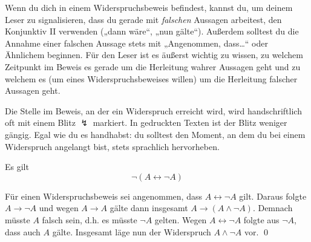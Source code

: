   
\begin{bem}[Signalwörter]
    Wenn du dich in einem Widerspruchsbeweis befindest, kannst du, um deinem Leser zu signalisieren, dass du gerade mit \emph{falschen} Aussagen arbeitest, den Konjunktiv II verwenden („dann wäre“, „nun gälte“). Außerdem solltest du die Annahme einer falschen Aussage stets mit „Angenommen, dass\dots“ oder Ähnlichem beginnen. Für den Leser ist es äußerst wichtig zu wissen, zu welchem Zeitpunkt im Beweis es gerade um die Herleitung wahrer Aussagen geht und zu welchem es (um eines Widerspruchsbeweises willen) um die Herleitung falscher Aussagen geht.
    
    Die Stelle im Beweis, an der ein Widerspruch erreicht wird, wird handschriftlich oft mit einem Blitz $\lightning$ markiert. In gedruckten Texten ist der Blitz weniger gängig. Egal wie du es handhabst: du solltest den Moment, an dem du bei einem Widerspruch angelangt bist, stets sprachlich hervorheben.
\end{bem}


\begin{satz}[*] \label{paradox}
    Es gilt
        \[ \neg (A\leftrightarrow \neg A) \]
\end{satz}


\begin{bew}
    Für einen Widerspruchsbeweis sei angenommen, dass $A\leftrightarrow \neg A$ gilt. Daraus folgte $A\to \neg A$ und wegen $A\to A$ gälte dann insgesamt $A\to (A\land \neg A)$. Demnach müsste $A$ falsch sein, d.h. es müsste $\neg A$ gelten. Wegen $A\leftrightarrow \neg A$ folgte aus $\neg A$, dass auch $A$ gälte. Insgesamt läge nun der Widerspruch $A\land \neg A$ vor. \qed
\end{bew}



